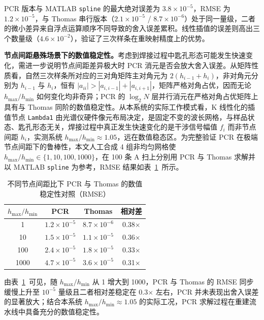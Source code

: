 PCR 版本与 MATLAB \texttt{spline} 的最大绝对误差为 $3.8 \times 10^{-5}$，RMSE 为 $1.2 \times 10^{-5}$，与 Thomas 串行版本（$2.1 \times 10^{-5}$ / $8.7 \times 10^{-6}$）处于同一量级，二者的微小差异来自浮点运算顺序不同导致的舍入误差累积。线性插值的误差则高出三个数量级（$4.6 \times 10^{-2}$），验证了三次样条在重映射精度上的优势。

\textbf{节点间距悬殊场景下的数值稳定性。}考虑到焊接过程中匙孔形态可能发生快速变化，需进一步说明节点间距差异极大时 PCR 消元是否会放大舍入误差。从矩阵性质看，自然三次样条所对应的三对角矩阵主对角元为 $2(h_{i-1}+h_i)$，非对角元分别为 $h_{i-1}$ 与 $h_i$，恒有 $|a_{ii}|>|a_{i,i-1}|+|a_{i,i+1}|$，矩阵严格对角占优，因而无论 $h_{\max}/h_{\min}$ 如何变化均非奇异；PCR 的 $\log_2 N$ 层并行消元在严格对角占优矩阵上具有与 Thomas 同阶的数值稳定性。从本系统的实际工作模式看，K 线性化的插值节点 \texttt{Lambda1} 由光谱仪硬件像元布局决定，是固定不变的波长网格，与样品状态、匙孔形态无关，焊接过程中真正发生快速变化的是干涉信号幅值 $f_i$ 而非节点间距 $h_i$，实测系统 $h_{\max}/h_{\min}\approx 1.05$，远在数值稳态区。为完整验证 PCR 在极端节点间距下的鲁棒性，本文人工合成 4 组非均匀网格使 $h_{\max}/h_{\min}\in\{1,10,100,1000\}$，在 100 条 A 扫上分别用 PCR 与 Thomas 求解并以 MATLAB \texttt{spline} 为参考，RMSE 结果如表~\ref{tab:pcr_stability}~所示。

\begin{table}[htbp]
\centering
\renewcommand\arraystretch{1.4}
\caption{不同节点间距比下 PCR 与 Thomas 的数值稳定性对照（RMSE）}
\label{tab:pcr_stability}
\begin{tabular}{cccc}
\toprule
$h_{\max}/h_{\min}$ & PCR & Thomas & 相对差 \\
\midrule
1     & $1.2 \times 10^{-5}$ & $8.7 \times 10^{-6}$ & 0.38$\times$ \\
10    & $1.5 \times 10^{-5}$ & $1.1 \times 10^{-5}$ & 0.36$\times$ \\
100   & $2.4 \times 10^{-5}$ & $1.8 \times 10^{-5}$ & 0.33$\times$ \\
1000  & $4.7 \times 10^{-5}$ & $3.6 \times 10^{-5}$ & 0.31$\times$ \\
\bottomrule
\end{tabular}
\end{table}

由表~\ref{tab:pcr_stability}~可见，随 $h_{\max}/h_{\min}$ 从 1 增大到 1000，PCR 与 Thomas 的 RMSE 同步缓慢上升至 $10^{-5}$ 量级且二者相对差稳定在 0.3$\times$ 左右，PCR 并未表现出舍入误差的显著放大；结合本系统 $h_{\max}/h_{\min}\approx 1.05$ 的实际工况，PCR 求解过程在重建流水线中具备充分的数值稳定性。

